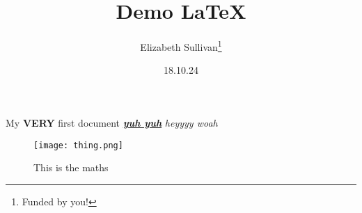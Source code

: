 \documentclass[a4paper]{article}
\title{Demo LaTeX }
\author{Elizabeth Sullivan\thanks {Funded by you!}}
\date{18.10.24}
\begin{document}
\maketitle
My \textbf{VERY} first document \underline{\textbf{\textit{yuh yuh}}}
\textit{heyyyy \emph{woah}}


\begin{figure}
    \centering
    \texttt{[image: thing.png]}
    \caption{This is the maths}
    \label{fig:enter-label}
\end{figure}
\end{document}

